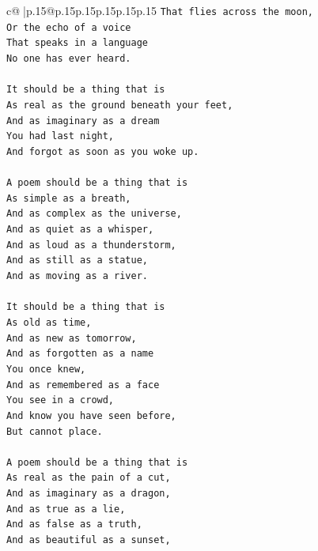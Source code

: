 \documentclass{article}
\begin{document}
{\begin{supertabular}{c@{$\;$}|p{.15\linewidth}@{}p{.15\linewidth}p{.15\linewidth}p{.15\linewidth}p{.15\linewidth}p{.15\linewidth}}
{{{\texttt{That flies across the moon,} \\
\texttt{Or the echo of a voice} \\
\texttt{That speaks in a language} \\
\texttt{No one has ever heard.} \\
\\ 
\texttt{It should be a thing that is} \\
\texttt{As real as the ground beneath your feet,} \\
\texttt{And as imaginary as a dream} \\
\texttt{You had last night,} \\
\texttt{And forgot as soon as you woke up.} \\
\\ 
\texttt{A poem should be a thing that is} \\
\texttt{As simple as a breath,} \\
\texttt{And as complex as the universe,} \\
\texttt{And as quiet as a whisper,} \\
\texttt{And as loud as a thunderstorm,} \\
\texttt{And as still as a statue,} \\
\texttt{And as moving as a river.} \\
\\ 
\texttt{It should be a thing that is} \\
\texttt{As old as time,} \\
\texttt{And as new as tomorrow,} \\
\texttt{And as forgotten as a name} \\
\texttt{You once knew,} \\
\texttt{And as remembered as a face} \\
\texttt{You see in a crowd,} \\
\texttt{And know you have seen before,} \\
\texttt{But cannot place.} \\
\\ 
\texttt{A poem should be a thing that is} \\
\texttt{As real as the pain of a cut,} \\
\texttt{And as imaginary as a dragon,} \\
\texttt{And as true as a lie,} \\
\texttt{And as false as a truth,} \\
\texttt{And as beautiful as a sunset,} \\
}}}
\end{supertabular}}
\end{document}

